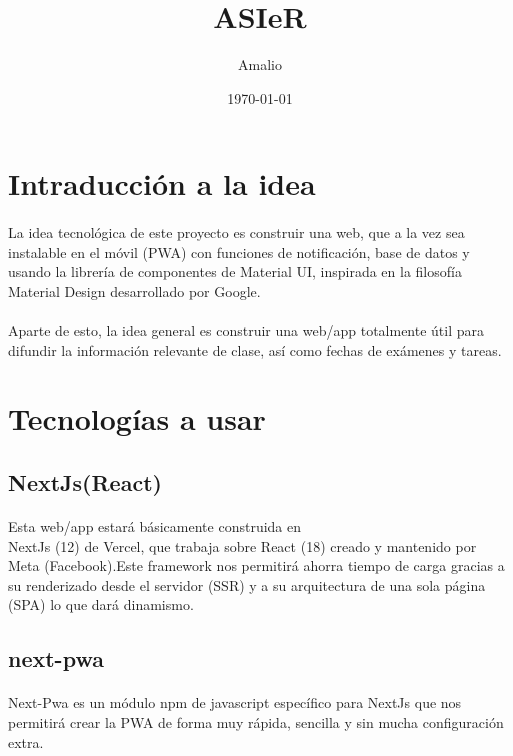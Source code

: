 \documentclass[a4paper]{article}
\title{ASIeR}
\author{Amalio}
\date{\today}
\begin{document}
    \maketitle
    \tableofcontents
    \section[Idea]{Intraducción a la idea}
    \paragraph{}
    La idea tecnológica de este proyecto es construir una web,
    que a la vez sea instalable en el móvil (PWA) con funciones de notificación,
    base de datos y usando la librería de componentes de Material UI, inspirada en la filosofía
    Material Design desarrollado por Google.
    \paragraph{}
    Aparte de esto, la idea general es construir una web/app 
    totalmente útil para difundir la información relevante de clase, 
    así como fechas de exámenes y tareas.
    \section[Tecnologías]{Tecnologías a usar}
    \subsection[Next Js]{NextJs(React)}
    \paragraph{}
    Esta web/app estará básicamente construida en\\ NextJs (12)
     de Vercel, que trabaja sobre React (18) 
    creado y mantenido por Meta (Facebook).Este 
    framework nos permitirá ahorra tiempo de carga gracias a su
    renderizado desde el servidor (SSR) y a su arquitectura de 
    una sola página (SPA) lo que dará dinamismo.
    \subsection[Next-PWA]{next-pwa}
    \paragraph{}
    Next-Pwa es un módulo npm de javascript específico para NextJs que nos 
    permitirá crear la PWA de forma muy rápida, sencilla y sin mucha configuración extra.
\end{document}
